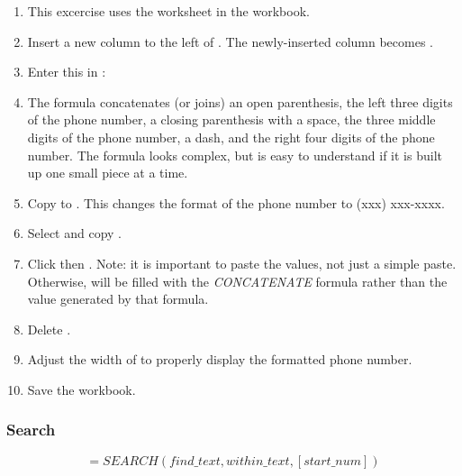 \begin{enumerate}
	\item This excercise uses the  worksheet in the  workbook.
	\item Insert a new column to the left of . The newly-inserted column becomes .
	\item Enter this in : 
	\item The formula concatenates (or joins) an open parenthesis, the left three digits of the phone number, a closing parenthesis with a space, the three middle digits of the phone number, a dash, and the right four digits of the phone number. The formula looks complex, but is easy to understand if it is built up one small piece at a time.
	\item Copy  to . This changes the format of the phone number to (xxx) xxx-xxxx.
	\item Select and copy .
	\item Click  then . Note: it is important to paste the values, not just a simple paste. Otherwise,  will be filled with the \textit{CONCATENATE} formula rather than the value generated by that formula.
	\item Delete .
	\item Adjust the width of  to properly display the formatted phone number.
	\item Save the  workbook.
\end{enumerate}

\subsubsection{Search}	

\[ =SEARCH(find\_text, within\_text, [start\_num]) \]


